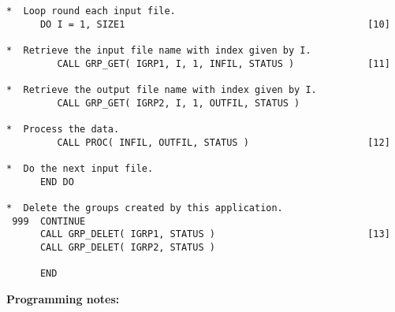 \begin{verbatim}
*  Loop round each input file.
      DO I = 1, SIZE1                                           [10]

*  Retrieve the input file name with index given by I.
         CALL GRP_GET( IGRP1, I, 1, INFIL, STATUS )             [11]

*  Retrieve the output file name with index given by I.
         CALL GRP_GET( IGRP2, I, 1, OUTFIL, STATUS )

*  Process the data.
         CALL PROC( INFIL, OUTFIL, STATUS )                     [12]

*  Do the next input file.
      END DO

*  Delete the groups created by this application.
 999  CONTINUE
      CALL GRP_DELET( IGRP1, STATUS )                           [13]
      CALL GRP_DELET( IGRP2, STATUS )

      END
\end{verbatim}
\normalsize

{\bf Programming notes:}

